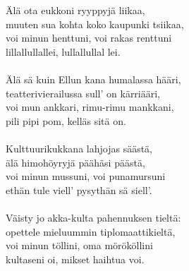 
            Älä ota eukkoni ryyppyjä liikaa, \\
            muuten sua kohta koko kaupunki tsiikaa, \\
            voi minun henttuni, voi rakas renttuni \\
            lillallullallei, lullallullal lei. \\
\hspace{10mm} \\
            Älä sä kuin Ellun kana humalassa hääri, \\
            teatterivierailussa sull’ on kärriääri, \\
            voi mun ankkari, rimu-rimu mankkani, \\
            pili pipi pom, kelläs sitä on. \\
\hspace{10mm} \\
            Kulttuurikukkana lahjojas säästä, \\
            älä himohöyryjä päähäsi päästä, \\
            voi minun mussuni, voi punamursuni \\
            ethän tule viell’ pysythän sä siell’. \\
\hspace{10mm} \\
            Väisty jo akka-kulta pahennuksen tieltä: \\
            opettele mieluummin tiplomaattikieltä, \\
            voi minun töllini, oma mörököllini \\
            kultaseni oi, mikset haihtua voi. \\
